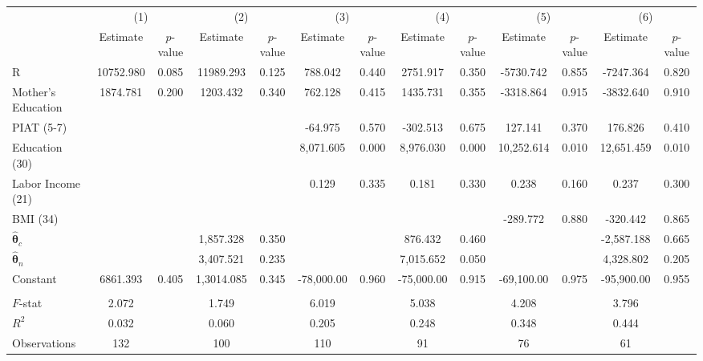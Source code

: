 \begin{tabular}{lcccccccccccc} \toprule
 & \multicolumn{2}{c}{(1)}  &  \multicolumn{2}{c}{(2)}  &  \multicolumn{2}{c}{(3)}  &  \multicolumn{2}{c}{(4)}  & \multicolumn{2}{c}{(5)} & \multicolumn{2}{c}{(6)} \\  
 & Estimate & $p$-value & Estimate & $p$-value & Estimate & $p$-value & Estimate & $p$-value & Estimate & $p$-value & Estimate & $p$-value \\ \midrule
R & 10752.980 &     0.085 & 11989.293 &     0.125 &   788.042 &     0.440 &  2751.917 &     0.350 & -5730.742 &     0.855 & -7247.364 &     0.820 \\  
Mother's Education &  1874.781 &     0.200 &  1203.432 &     0.340 &   762.128 &     0.415 &  1435.731 &     0.355 & -3318.864 &     0.915 & -3832.640 &     0.910 \\  
PIAT (5-7) &         &         &         &         &   -64.975 &     0.570 &  -302.513 &     0.675 &   127.141 &     0.370 &   176.826 &     0.410 \\  
Education (30) &         &         &         &         &  8,071.605 &     0.000 &  8,976.030 &     0.000 & 10,252.614 &     0.010 & 12,651.459 &     0.010 \\  
Labor Income (21) &         &         &         &         &     0.129 &     0.335 &     0.181 &     0.330 &     0.238 &     0.160 &     0.237 &     0.300 \\  
BMI (34) &         &         &         &         &         &         &         &         &  -289.772 &     0.880 &  -320.442 &     0.865 \\  
$\hat{\bm{\theta}}_{c}$  &         &         &  1,857.328 &     0.350 &         &         &   876.432 &     0.460 &         &         & -2,587.188 &     0.665 \\  
$\hat{\bm{\theta}}_{n}$  &         &         &  3,407.521 &     0.235 &         &         &  7,015.652 &     0.050 &         &         &  4,328.802 &     0.205 \\  
Constant  &  6861.393 &     0.405 & 1,3014.085 &     0.345 & -78,000.00 &     0.960 & -75,000.00 &     0.915 & -69,100.00 &     0.975 & -95,900.00 &     0.955 \\ \\ \midrule
$F$-stat &     2.072 &      &     1.749 &      &     6.019 &      &     5.038 &      &     4.208 &      &     3.796 &      \\  
$R^2$ &     0.032 &      &     0.060 &      &     0.205 &      &     0.248 &      &     0.348 &      &     0.444 &     \\  
Observations &   132 &    &    100 &      &   110 &     &    91 &     &    76 &      &    61 &     \\  
\bottomrule \end{tabular}
